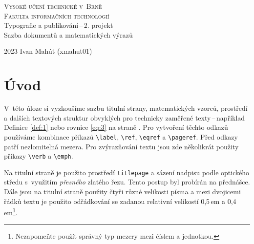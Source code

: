 \documentclass[a4paper, 11pt, twocolumn]{article}
\begin{document}

\begin{titlepage}
    \onecolumn
    \begin{center}
        {\Huge\textsc{Vysoké učení technické v~Brně\\[0.5em]}}
        {\huge\textsc{Fakulta informačních technologií}}\\
        {\LARGE Typografie a publikování\,--\,2. projekt\\[0.4em] 
        Sazba dokumentů a matematických výrazů}\\
    \end{center}
    {\Large 2023 \hfill Ivan Mahút (xmahut01)}
\end{titlepage}

\clearpage
\setcounter{page}{1}

\section*{Úvod} 
\label{uvod}
V~této úloze si vyzkoušíme sazbu titulní strany, matematických vzorců, 
prostředí a dalších textových struktur obvyklých pro technicky zaměřené texty\,--\,například Definice \ref{def:1} nebo rovnice \eqref{eq:3} na straně \pageref{def:1}. Pro vytvoření těchto odkazů 
používáme kombinace příkazů \verb|\label|, \verb|\ref|, \verb|\eqref| a \verb|\pageref|. Před odkazy patří nezlomitelná mezera. 
Pro zvýrazňování textu jsou zde několikrát použity příkazy \verb|\verb| a \verb|\emph|.\par 
Na titulní straně je použito prostředí \verb|titlepage| a sázení nadpisu podle optického středu 
s~využitím \emph{přesného} zlatého řezu. Tento postup byl probírán na přednášce. 
Dále jsou na titulní straně použity čtyři různé velikosti písma a mezi dvojicemi řádků textu je použito odřádkování se zadanou relativní 
velikostí 0,5\,em a 0,4\,em\footnote[1]{Nezapomeňte použít správný typ mezery mezi číslem a jednotkou.}.
\end{document}
